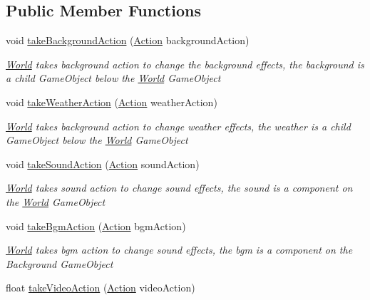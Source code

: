 \subsection*{Public Member Functions}
\begin{DoxyCompactItemize}
\item 
void \hyperlink{class_world_ab49162762b62c4f38a8f0a1757c881e0}{take\+Background\+Action} (\hyperlink{classdoki_script_setting_1_1_action}{Action} background\+Action)
\begin{DoxyCompactList}\small\item\em \hyperlink{class_world}{World} takes background action to change the background effects, the background is a child Game\+Object below the \hyperlink{class_world}{World} Game\+Object \end{DoxyCompactList}\item 
void \hyperlink{class_world_ad903e6d33c16edb01e13c8dc1ba18c9c}{take\+Weather\+Action} (\hyperlink{classdoki_script_setting_1_1_action}{Action} weather\+Action)
\begin{DoxyCompactList}\small\item\em \hyperlink{class_world}{World} takes background action to change weather effects, the weather is a child Game\+Object below the \hyperlink{class_world}{World} Game\+Object \end{DoxyCompactList}\item 
void \hyperlink{class_world_ab892dedd08be3002e75cd2ca8785bb81}{take\+Sound\+Action} (\hyperlink{classdoki_script_setting_1_1_action}{Action} sound\+Action)
\begin{DoxyCompactList}\small\item\em \hyperlink{class_world}{World} takes sound action to change sound effects, the sound is a component on the \hyperlink{class_world}{World} Game\+Object \end{DoxyCompactList}\item 
void \hyperlink{class_world_af4349abca56d6e66009aff1cdf59c387}{take\+Bgm\+Action} (\hyperlink{classdoki_script_setting_1_1_action}{Action} bgm\+Action)
\begin{DoxyCompactList}\small\item\em \hyperlink{class_world}{World} takes bgm action to change sound effects, the bgm is a component on the Background Game\+Object \end{DoxyCompactList}\item 
float \hyperlink{class_world_a23bd10af7aa6fd7d54d71a8fa73fc71a}{take\+Video\+Action} (\hyperlink{classdoki_script_setting_1_1_action}{Action} video\+Action)

\end{DoxyCompactItemize}
